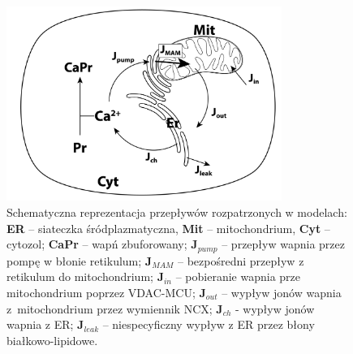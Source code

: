 \begin{figure}[tb]
\centering
\includegraphics[width=0.8\textwidth]{rysunki/rozdzial_4/scheme.png}
\caption[Schematyczna reprezentacja modelu]{Schematyczna reprezentacja przepływów rozpatrzonych w modelach: \textbf{ER} -- siateczka śródplazmatyczna, \textbf{Mit} -- mitochondrium, \textbf{Cyt} -- cytozol; \textbf{CaPr} -- wapń zbuforowany; ${\boldsymbol J_{pump}}$ -- przepływ wapnia przez pompę w błonie retikulum; ${\boldsymbol J_{MAM}}$ -- bezpośredni przepływ z retikulum do mitochondrium; ${\boldsymbol J_{in}}$ -- pobieranie wapnia prze mitochondrium poprzez VDAC-MCU; ${\boldsymbol J_{out}}$ -- wypływ jonów wapnia z~mitochondrium przez wymiennik NCX; ${\boldsymbol J_{ch}}$ - wypływ jonów wapnia z ER; ${\boldsymbol J_{leak}}$ -- niespecyficzny wypływ z ER przez błony białkowo-lipidowe.}
\label{fig:scheme}
\end{figure}

